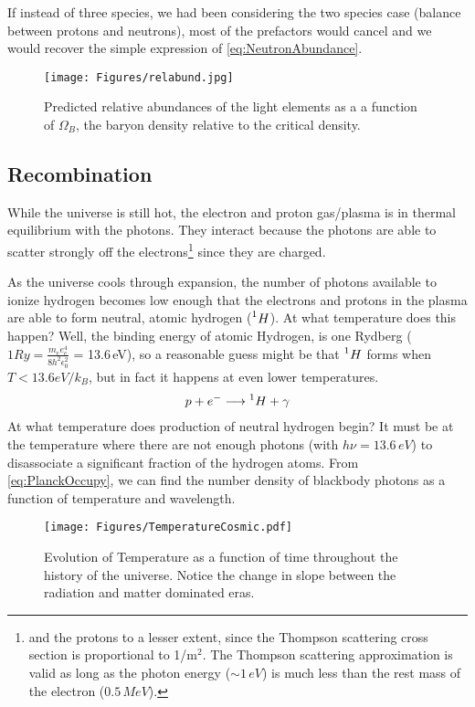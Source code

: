 If instead of three species, we had been considering the two species case (balance between protons and neutrons), most of the prefactors would cancel and we would recover the simple expression of \cref{eq:NeutronAbundance}.


\begin{figure}[h]
\centering
\texttt{[image: Figures/relabund.jpg]}
\caption{Predicted relative abundances of the light elements as a
a function of $\Omega_B$, the baryon density relative to the 
critical density.}
\label{fig:Neutrons}
\end{figure}


\subsection{Recombination}
While the universe is still hot, the electron and proton gas/plasma is in thermal equilibrium with the photons. They interact because the photons are able to scatter strongly off the electrons\footnote{and the protons to a lesser extent, since the Thompson scattering cross section is proportional to 1/m$^2$. The Thompson scattering approximation is valid as long as the photon 
energy ($\sim 1\,eV$) is much less than the rest mass of the 
electron ($0.5\,MeV$).} since they are charged.

As the universe cools through expansion, the number of photons available to ionize 
hydrogen becomes low enough that the electrons and protons in the plasma are able to 
form neutral, atomic hydrogen ($\prescript{1}{}H$). At what temperature does this happen? Well, the
binding energy of atomic Hydrogen, is one Rydberg 
($1 Ry = \frac{m_e e_c^4}{8 h^2 \epsilon_0^2}$ = 13.6\,eV), so a reasonable guess might be that
$\prescript{1}{}H$ forms when $T < 13.6 eV / k_B$, but in fact it happens at even lower temperatures. 
\begin{align}
p + e^- \longrightarrow \prescript{1}{}H + \gamma
\end{align}
At what temperature does production of neutral hydrogen begin? It must be at the temperature where there are not enough photons (with $h \nu = 13.6\,eV$) to disassociate a significant fraction of the hydrogen atoms. 
From \cref{eq:PlanckOccupy}, we can find the number density of 
blackbody photons as a function of temperature and wavelength.


\begin{figure}[h]
\centering
\texttt{[image: Figures/TemperatureCosmic.pdf]}
\caption{Evolution of Temperature as a function of time throughout the history of the universe.
Notice the change in slope between the radiation and matter dominated eras.}
\label{fig:TempVsTime}
\end{figure}



